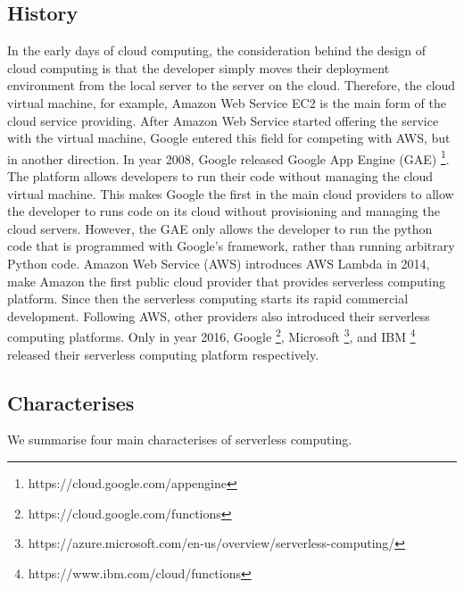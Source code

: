 \subsection{History}
In the early days of cloud computing, the consideration behind the design of cloud computing is that the developer simply moves their deployment environment from the local server to the server on the cloud. Therefore, the cloud virtual machine, for example, Amazon Web Service EC2 is the main form of the cloud service providing. 
After Amazon Web Service started offering the service with the virtual machine, Google entered this field for competing with AWS, but in another direction.
In year 2008, Google released Google App Engine (GAE) \footnote{https://cloud.google.com/appengine}\cite{zahariev2009google}. The platform allows developers to run their code without managing the cloud virtual machine. This makes Google the first in the main cloud providers to allow the developer to runs code on its cloud without provisioning and managing the cloud servers. However, the GAE only allows the developer to run the python code that is programmed with Google's framework, rather than running arbitrary Python code. 
Amazon Web Service (AWS) introduces AWS Lambda in 2014, make Amazon the first public cloud provider that provides serverless computing platform\cite{Serverle77:online}. Since then the serverless computing starts its rapid commercial development. Following AWS, other providers also introduced their serverless computing platforms. Only in year 2016, Google \footnote{https://cloud.google.com/functions}, Microsoft \footnote{https://azure.microsoft.com/en-us/overview/serverless-computing/}, and IBM \footnote{https://www.ibm.com/cloud/functions} released their serverless computing platform respectively.
\subsection{Characterises}
We summarise four main characterises of serverless computing. 
